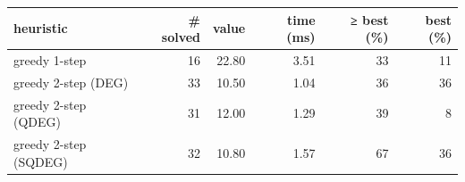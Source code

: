 \begin{tabular}{lrrrrr}
\toprule
heuristic & # solved & value & time (ms) & ≥ best (\%) & best (\%) \\
\midrule
greedy 1-step & 16 & 22.80 & 3.51 & 33 & 11 \\
greedy 2-step (DEG) & 33 & 10.50 & 1.04 & 36 & 36 \\
greedy 2-step (QDEG) & 31 & 12.00 & 1.29 & 39 & 8 \\
greedy 2-step (SQDEG) & 32 & 10.80 & 1.57 & 67 & 36 \\
\bottomrule
\end{tabular}
